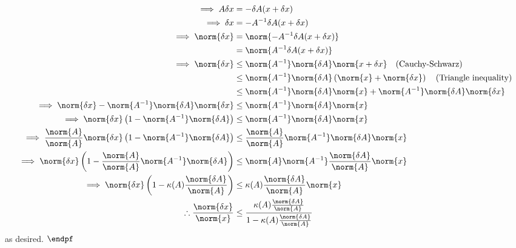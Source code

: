 \documentclass{report}
\begin{document}
\begin{itemize}
\begin{align*}
            \implies A \delta x &= - \delta A(x + \delta x) \\
            \implies \delta x &= -A^{-1}\delta A(x + \delta x) \\
            \implies \norm{\delta x} &= \norm{-A^{-1}\delta A(x + \delta x)} \\
                                     &=\norm{A^{-1}\delta A(x + \delta x)} \\
            \implies \norm{\delta x} &\leq \norm{A^{-1}}\norm{\delta A}\norm{x + \delta x} \quad \text{(Cauchy-Schwarz)} \\
                                     &\leq \norm{A^{-1}}\norm{\delta  A}\left(\norm{x} + \norm{\delta x}\right) \quad \text{(Triangle inequality)} \\
                                     &\leq \norm{A^{-1}}\norm{\delta A}\norm{x} + \norm{A^{-1}}\norm{\delta A}\norm{\delta x} \\
            \implies \norm{\delta x} - \norm{A^{-1}}\norm{\delta A}\norm{\delta x} & \leq \norm{A^{-1}}\norm{\delta A}\norm{x} \\ 
            \implies \norm{\delta x}\left(1-\norm{A^{-1}}\norm{\delta A}\right) & \leq \norm{A^{-1}}\norm{\delta A}\norm{x} \\
            \implies \frac{\norm{A}}{\norm{A}}\norm{\delta x}\left(1-\norm{A^{-1}}\norm{\delta A}\right) & \leq \frac{\norm{A}}{\norm{A}}\norm{A^{-1}}\norm{\delta A}\norm{x} \\
            \implies \norm{\delta x}\left(1-\frac{\norm{A}}{\norm{A}}\norm{A^{-1}}\norm{\delta A}\right) & \leq \norm{A}\norm{A^{-1}} \frac{\norm{\delta A}}{\norm{A}}\norm{x} \\
            \implies \norm{\delta x}\left(1-\kappa(A)\frac{\norm{\delta A}}{\norm{A}}\right) & \leq \kappa(A) \frac{\norm{\delta A}}{\norm{A}} \norm{x} \\
            \therefore \frac{\norm{\delta x}}{\norm{x}} & \leq \frac{\kappa(A)\frac{\norm{\delta A}}{\norm{A}}}{1-\kappa(A)\frac{\norm{\delta A}}{\norm{A}}}
        \end{align*}
        as desired. $\endpf $




\end{itemize}
\end{document}
